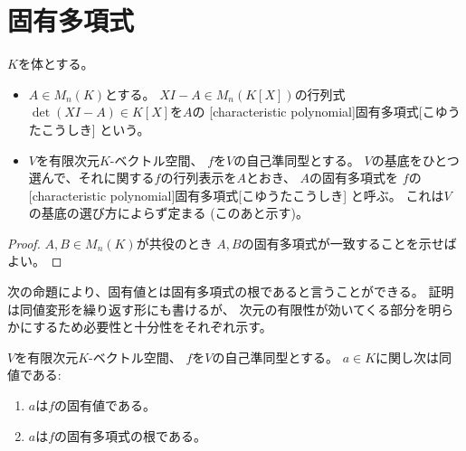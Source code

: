 \documentclass[report]{jlreq}
\begin{document}
\section{固有多項式}

\begin{definition}[固有多項式]
    $K$を体とする。
    \begin{itemize}
        \item $A \in M_n(K)$とする。
            $XI - A \in M_n(K[X])$の行列式
            $\det (XI - A) \in K[X]$を$A$の
            [characteristic polynomial]{固有多項式}[こゆうたこうしき]
            という。
        \item $V$を有限次元$K$-ベクトル空間、
            $f$を$V$の自己準同型とする。
            $V$の基底をひとつ選んで、それに関する$f$の行列表示を$A$とおき、
            $A$の固有多項式を
            $f$の[characteristic polynomial]{固有多項式}[こゆうたこうしき]
            と呼ぶ。
            これは$V$の基底の選び方によらず定まる (このあと示す)。
    \end{itemize}
\end{definition}

\begin{proof}
    $A, B \in M_n(K)$が共役のとき
    $A, B$の固有多項式が一致することを示せばよい。
    \TODO{}
\end{proof}

次の命題により、固有値とは固有多項式の根であると言うことができる。
証明は同値変形を繰り返す形にも書けるが、
次元の有限性が効いてくる部分を明らかにするため必要性と十分性をそれぞれ示す。

\begin{proposition}[固有値と固有多項式の関係]
    $V$を有限次元$K$-ベクトル空間、
    $f$を$V$の自己準同型とする。
    $a \in K$に関し次は同値である:
    \begin{enumerate}
        \item $a$は$f$の固有値である。
        \item $a$は$f$の固有多項式の根である。
    \end{enumerate}
\end{proposition}
\end{document}
